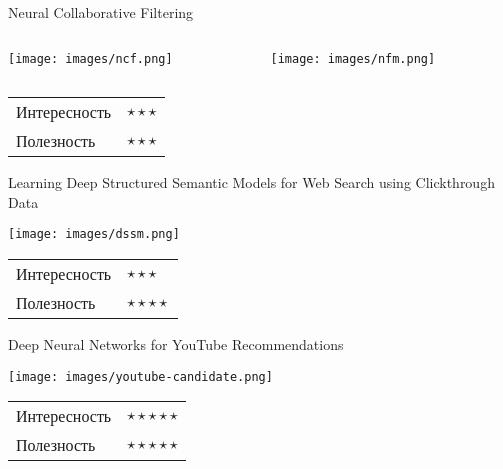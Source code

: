 \documentclass[11pt,aspectratio=169,handout]{beamer}
\begin{document}
\begin{frame}{Neural Collaborative Filtering \cite{NCF}}

\begin{columns}
\begin{column}{0.45\textwidth} 
\begin{center}
\texttt{[image: images/ncf.png]}
\end{center}
\end{column}
\begin{column}{0.45\textwidth}
\begin{center}
\texttt{[image: images/nfm.png]}
\end{center}
\end{column}
\end{columns}

\begin{tabular}{l l}
Интересность & $\star\star\star$ \\
Полезность & $\star\star\star$
\end{tabular}

\end{frame}

\begin{frame}{Learning Deep Structured Semantic Models for Web Search using Clickthrough Data \cite{DSSM}}

\begin{center}
\texttt{[image: images/dssm.png]}
\end{center}

\begin{tabular}{l l}
Интересность & $\star\star\star$ \\
Полезность & $\star\star\star\star$
\end{tabular}

\end{frame}

\begin{frame}{Deep Neural Networks for YouTube Recommendations \cite{YTBE}}

\begin{center}
\texttt{[image: images/youtube-candidate.png]}
\end{center}

\begin{tabular}{l l}
Интересность & $\star\star\star\star\star$ \\
Полезность & $\star\star\star\star\star$
\end{tabular}

\end{frame}
\end{document}

